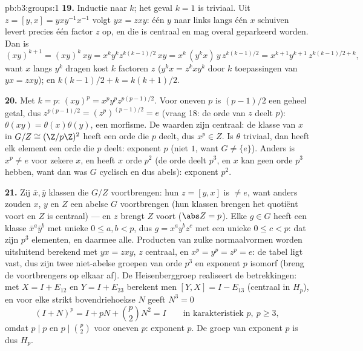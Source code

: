\begin{solution}{pb:b3:groups:1}
\textbf{19.} Inductie naar $k$; het geval $k = 1$ is triviaal. Uit
$z = [y, x] = yxy^{-1}x^{-1}$ volgt $yx = zxy$: één $y$ naar links
langs één $x$ schuiven levert precies één factor $z$ op, en die is
centraal en mag overal geparkeerd worden. Dan is
\[
(xy)^{k+1} = (xy)^k\,xy = x^ky^kz^{k(k-1)/2}\,xy
= x^k\,(y^kx)\,y\,z^{k(k-1)/2}
= x^{k+1}y^{k+1}\,z^{k(k-1)/2 + k},
\]
want $x$ langs $y^k$ dragen kost $k$ factoren $z$ ($y^kx = z^kxy^k$
door $k$ toepassingen van $yx = zxy$); en $k(k-1)/2 + k =
k(k+1)/2$.

\textbf{20.} Met $k = p$: $(xy)^p = x^py^pz^{p(p-1)/2}$. Voor
oneven $p$ is $(p-1)/2$ een geheel getal, dus $z^{p(p-1)/2} =
(z^p)^{(p-1)/2} = e$ (vraag 18: de orde van $z$ deelt $p$):
$\theta(xy) = \theta(x)\theta(y)$, een morfisme. De waarden zijn
centraal: de klasse van $x$ in $G/Z \cong (\Z/p\Z)^2$ heeft een
orde die $p$ deelt, dus $x^p \in Z$. Is $\theta$ triviaal, dan
heeft elk element een orde die $p$ deelt: exponent $p$ (niet $1$,
want $G \neq \{e\}$). Anders is $x^p \neq e$ voor zekere $x$, en
heeft $x$ orde $p^2$ (de orde deelt $p^3$, en $x$ kan geen orde
$p^3$ hebben, want dan was $G$ cyclisch en dus abels): exponent
$p^2$.

\textbf{21.} Zij $\bar x, \bar y$ klassen die $G/Z$ voortbrengen:
hun  $z = [y, x]$ is $\neq e$, want anders zouden $x$,
$y$ en $Z$ een abelse $G$ voortbrengen (hun klassen brengen het
quotiënt voort en $Z$ is centraal) --- en $z$ brengt $Z$ voort
($\abs Z = p$). Elke $g \in G$ heeft een klasse $\bar x^a\bar y^b$
met unieke $0 \leq a, b < p$, dus $g = x^ay^bz^c$ met een unieke $0
\leq c < p$: dat zijn $p^3$ elementen, en daarmee alle. Producten
van zulke normaalvormen worden uitsluitend berekend met $yx = zxy$,
$z$ centraal, en $x^p = y^p = z^p = e$: de tabel ligt vast, dus
zijn twee niet-abelse groepen van orde $p^3$ en exponent $p$
isomorf (breng de voortbrengers op elkaar af). De Heisenberggroep
realiseert de betrekkingen: met $X = I + E_{12}$ en $Y = I +
E_{23}$ berekent men $[Y, X] = I - E_{13}$ (centraal in $H_p$), en
voor elke strikt bovendriehoekse $N$ geeft $N^3 = 0$
\[
(I + N)^p = I + pN + \binom p2N^2 = I
\qquad\text{in karakteristiek } p,\ p \geq 3,
\]
omdat $p \mid p$ en $p \mid \binom p2$ voor oneven $p$: exponent
$p$. De groep van exponent $p$ is dus $H_p$.


\end{solution}
